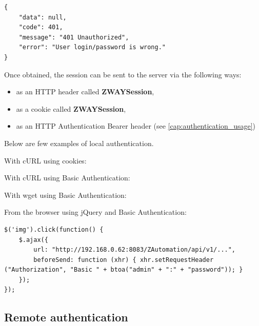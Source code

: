 \begin{lstlisting}[caption=Wrong login/password reply,basicstyle=\small,columns=fullflexible]
{
    "data": null,
    "code": 401,
    "message": "401 Unauthorized",
    "error": "User login/password is wrong."
}
\end{lstlisting}

Once obtained, the session can be sent to the \zway server via the following ways:
\begin{itemize}
\item as an HTTP header called \textbf{ZWAYSession},
\item as a cookie called \textbf{ZWAYSession},
\item as an HTTP Authentication Bearer header (see \ref{cap:authentication_usage})
\end{itemize}

Below are few examples of local authentication.

With cURL using cookies:
{\scriptsize
\begin{quote} 
\end{quote}
}

With cURL using Basic Authentication:
{\scriptsize
\begin{quote} 
\end{quote}
}

With wget using Basic Authentication:
{\scriptsize
\begin{quote} 
\end{quote}
}

From the browser using jQuery and Basic Authentication:
\begin{lstlisting}[caption=Login with jQuery,basicstyle=\small,columns=fullflexible]
$('img').click(function() {
    $.ajax({
        url: "http://192.168.0.62:8083/ZAutomation/api/v1/...",
        beforeSend: function (xhr) { xhr.setRequestHeader ("Authorization", "Basic " + btoa("admin" + ":" + "password")); }
    });
});
\end{lstlisting}

\subsection{Remote authentication}
\label{cap:authentication_remote}

